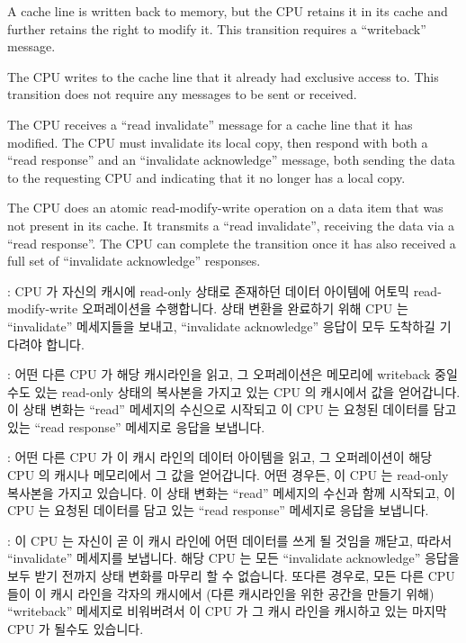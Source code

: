 \begin{description}[style=nextline]
\item	[Transition (a):]
	A cache line is written back to memory, but the CPU retains
	it in its cache and further retains the right to modify it.
	This transition requires a ``writeback'' message.
\item	[Transition (b):]
	The CPU writes to the cache line that it already had exclusive
	access to.
	This transition does not require any messages to be sent or
	received.
\item	[Transition (c):]
	The CPU receives a ``read invalidate'' message for a cache line
	that it has modified.
	The CPU must invalidate its local copy, then respond with both a
	``read response'' and an ``invalidate acknowledge'' message,
	both sending the data to the requesting CPU and indicating
	that it no longer has a local copy.
\item	[Transition (d):]
	The CPU does an atomic read-modify-write operation on a data item
	that was not present in its cache.
	It transmits a ``read invalidate'', receiving the data via
	a ``read response''.
	The CPU can complete the transition once it has also received a
	full set of ``invalidate acknowledge'' responses.
\fi
\item	[상태 변화 (e)]:
	CPU 가 자신의 캐시에 read-only 상태로 존재하던 데이터 아이템에 어토믹
	read-modify-write 오퍼레이션을 수행합니다.
	상태 변환을 완료하기 위해 CPU 는 ``invalidate'' 메세지들을 보내고,
	``invalidate acknowledge'' 응답이 모두 도착하길 기다려야 합니다.
\item	[상태 변화 (f)]:
	어떤 다른 CPU 가 해당 캐시라인을 읽고, 그 오퍼레이션은 메모리에
	writeback 중일 수도 있는 read-only 상태의 복사본을 가지고 있는 CPU 의
	캐시에서 값을 얻어갑니다.
	이 상태 변화는 ``read'' 메세지의 수신으로 시작되고 이 CPU 는 요청된
	데이터를 담고 있는 ``read response'' 메세지로 응답을 보냅니다.
\item	[상태 변화 (g)]:
	어떤 다른 CPU 가 이 캐시 라인의 데이터 아이템을 읽고, 그 오퍼레이션이
	해당 CPU 의 캐시나 메모리에서 그 값을 얻어갑니다.
	어떤 경우든, 이 CPU 는 read-only 복사본을 가지고 있습니다.
	이 상태 변화는 ``read'' 메세지의 수신과 함께 시작되고, 이 CPU 는 요청된
	데이터를 담고 있는 ``read response'' 메세지로 응답을 보냅니다.
\item	[상태 변화 (h)]:
	이 CPU 는 자신이 곧 이 캐시 라인에 어떤 데이터를 쓰게 될 것임을 깨닫고,
	따라서 ``invalidate'' 메세지를 보냅니다.
	해당 CPU 는 모든 ``invalidate acknowledge'' 응답을 보두 받기 전까지
	상태 변화를 마무리 할 수 없습니다.
	또다른 경우로, 모든 다른 CPU 들이 이 캐시 라인을 각자의 캐시에서 (다른
	캐시라인을 위한 공간을 만들기 위해) ``writeback'' 메세지로 비워버려서
	이 CPU 가 그 캐시 라인을 캐시하고 있는 마지막 CPU 가 될수도 있습니다.
\iffalse


\end{description}
